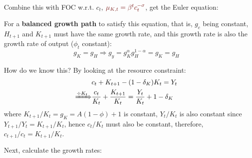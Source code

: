 \documentclass[10pt,landscape,a4paper]{article}
\begin{document}
\begin{multicols*}{3}
Combine this with FOC w.r.t. $c_t$, ${\color{myred}\mu_{K,t}=\beta^t c_t^{-\sigma}}$, get the Euler equation:

\vspace{2pt}

\vspace{2pt}
For a \textbf{balanced growth path} to satisfy this equation, that is, $g_c$ being constant, $H_{t+1}$ and $K_{t+1}$ must have the same growth rate, and this growth rate is also the growth rate of output ($\phi_t$ constant): 
$$ g_K = g_H\Rightarrow g_y =g_K^{\alpha}g_H^{1-\alpha}=g_K=g_H$$

How do we know this? By looking at the resource constraint:
\begin{align*}
    & c_t+K_{t+1}-(1-\delta_K)K_t =Y_t\\
    \xRightarrow{\div K_t} &  \frac{c_t}{K_t}+\frac{K_{t+1}}{K_t}=\frac{Y_t}{K_t}+1-\delta_K
\end{align*}
where $K_{t+1}/K_t=g_K =A(1-\phi)+1 $ is constant, $Y_t/K_t$ is also constant since $Y_{t+1}/Y_t=K_{t+1}/K_t$, hence $c_t/K_t$ must also be constant, therefore, $c_{t+1}/c_{t}=K_{t+1}/K_t$.

Next, calculate the growth rates:


\end{multicols*}
\end{document}
